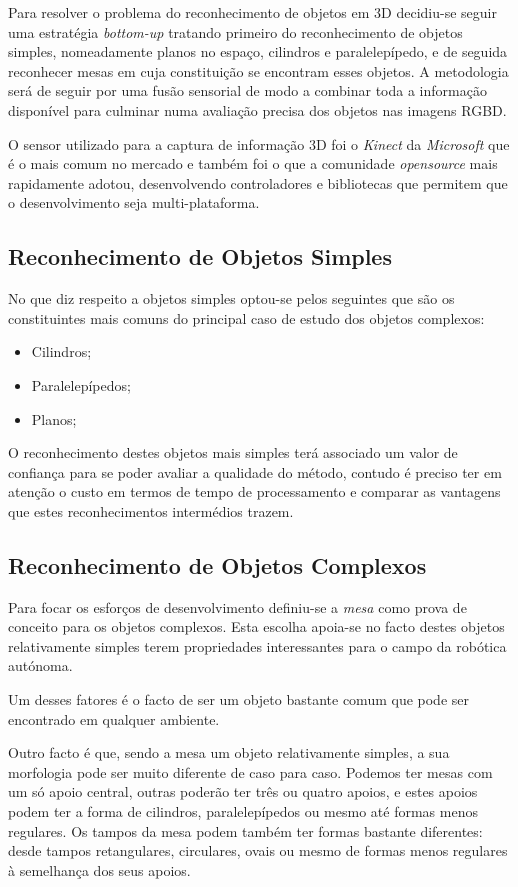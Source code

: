 Para resolver o problema do reconhecimento de objetos em 3D decidiu-se seguir uma estratégia \emph{bottom-up} tratando primeiro do reconhecimento de objetos simples, nomeadamente planos no espaço, cilindros e paralelepípedo, e de seguida reconhecer mesas em cuja constituição se encontram esses objetos. A metodologia será de seguir por uma fusão sensorial de modo a combinar toda a informação disponível para culminar numa avaliação precisa dos objetos nas imagens RGBD.

O sensor utilizado para a captura de informação 3D foi o \emph{Kinect} da \emph{Microsoft} que é o mais comum no mercado e também foi o que a comunidade \emph{opensource} mais rapidamente adotou, desenvolvendo controladores e bibliotecas que permitem que o desenvolvimento seja multi-plataforma.


\subsection{Reconhecimento de Objetos Simples}

No que diz respeito a objetos simples optou-se pelos seguintes que são os constituintes mais comuns
do principal caso de estudo dos objetos complexos:
\begin{itemize}
\item Cilindros;
\item Paralelepípedos;
\item Planos;
\end{itemize}

O reconhecimento destes objetos mais simples terá associado um valor de confiança para se poder avaliar a qualidade do método, contudo é preciso ter em atenção o custo em termos de tempo de processamento e comparar as vantagens que estes reconhecimentos intermédios trazem.
 
\subsection{Reconhecimento de Objetos Complexos}

Para focar os esforços de desenvolvimento definiu-se a \emph{mesa} como prova de conceito para os objetos complexos. Esta escolha apoia-se no facto destes objetos relativamente simples terem propriedades interessantes para o campo da robótica autónoma.

Um desses fatores é o facto de ser um objeto bastante comum que pode ser encontrado em qualquer ambiente.

Outro facto é que, sendo a mesa um objeto relativamente simples, a sua morfologia pode ser muito diferente de caso para caso. Podemos ter mesas com um só apoio central, outras poderão ter três ou quatro apoios, e estes apoios podem ter a forma de cilindros, paralelepípedos ou mesmo até formas menos regulares. Os tampos da mesa podem também ter formas bastante diferentes: desde tampos retangulares, circulares, ovais ou mesmo de formas menos regulares à semelhança dos seus apoios.

